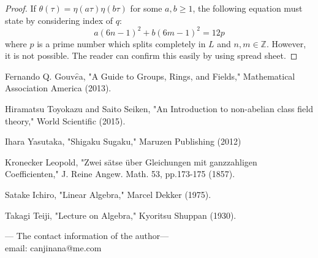 \documentclass{article}
\begin{document}
\begin{proof}
If $\theta(\tau) = \eta(a\tau)\eta(b\tau)$ for some $a, b \geq 1$, the following equation must state by considering index of $q$:
\begin{equation}
a(6n-1)^{2} + b(6m-1)^{2} = 12p
\end{equation}
where $p$ is a prime number which splits completely in $L$ and $n, m\in \mathbb{Z}$. However, it is not possible. The reader can confirm this easily by using spread sheet.
\end{proof}

\begin{thebibliography}{3}

 Fernando Q. Gouv$\hat{e}$a,
"A Guide to Groups, Rings, and Fields," Mathematical Association America (2013).

 Hiramatsu Toyokazu and Saito Seiken,
"An Introduction to non-abelian class field theory," World Scientific (2015).

 Ihara Yasutaka,
"Shigaku Sugaku," Maruzen Publishing (2012)

 Kronecker Leopold,
"Zwei s\"atse \"uber Gleichungen mit ganzzahligen Coefficienten," J. Reine Angew. Math. 53, pp.173-175 (1857).

 Satake Ichiro,
"Linear Algebra," Marcel Dekker (1975).

 Takagi Teiji,
"Lecture on Algebra," Kyoritsu Shuppan (1930).

\end{thebibliography}
--- The contact information of the author---
\\
email: canjinana@me.com
\\
\end{document}

